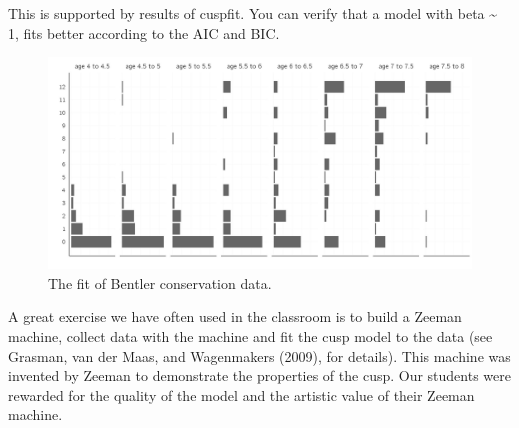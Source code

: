 \documentclass[
  a4paper,
  DIV=11,
  numbers=noendperiod]{scrreprt}
\begin{document}
This is supported by results of cuspfit. You can verify that a model
with beta \textasciitilde{} 1, fits better according to the AIC and BIC.

\begin{figure}

{\centering \includegraphics{media/ch3/fig-ch3-img25-old-37.jpg}

}

\caption{\label{fig-ch3-img25-old-37}The fit of Bentler conservation
data.}

\end{figure}

A great exercise we have often used in the classroom is to build a
Zeeman machine, collect data with the machine and fit the cusp model to
the data (see Grasman, van der Maas, and Wagenmakers (2009), for
details). This machine was invented by Zeeman to demonstrate the
properties of the cusp. Our students were rewarded for the quality of
the model and the artistic value of their Zeeman machine.
\end{document}
